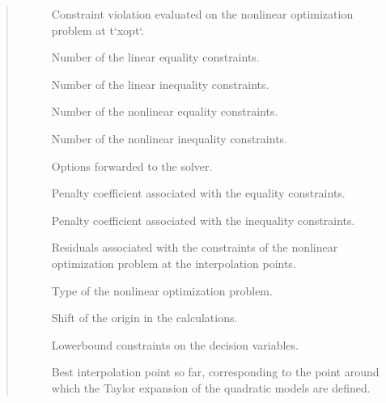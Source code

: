 \documentclass[letterpaper,10pt,english]{sphinxmanual}
\begin{document}
\begin{fulllineitems}
\begin{quote}
\begin{description}
\begin{description}
\item[{}] \leavevmode
\sphinxAtStartPar
Constraint violation evaluated on the nonlinear optimization problem at t`xopt`.

\item[{}] \leavevmode
\sphinxAtStartPar
Number of the linear equality constraints.

\item[{}] \leavevmode
\sphinxAtStartPar
Number of the linear inequality constraints.

\item[{}] \leavevmode
\sphinxAtStartPar
Number of the nonlinear equality constraints.

\item[{}] \leavevmode
\sphinxAtStartPar
Number of the nonlinear inequality constraints.

\item[{}] \leavevmode
\sphinxAtStartPar
Options forwarded to the solver.

\item[{}] \leavevmode
\sphinxAtStartPar
Penalty coefficient associated with the equality constraints.

\item[{}] \leavevmode
\sphinxAtStartPar
Penalty coefficient associated with the inequality constraints.

\item[{}] \leavevmode
\sphinxAtStartPar
Residuals associated with the constraints of the nonlinear optimization problem at the interpolation points.

\item[{}] \leavevmode
\sphinxAtStartPar
Type of the nonlinear optimization problem.

\item[{}] \leavevmode
\sphinxAtStartPar
Shift of the origin in the calculations.

\item[{}] \leavevmode
\sphinxAtStartPar
Lower\sphinxhyphen{}bound constraints on the decision variables.

\item[{}] \leavevmode
\sphinxAtStartPar
Best interpolation point so far, corresponding to the point around which the Taylor expansion of the quadratic models are defined.


\end{description}
\end{description}
\end{quote}
\end{fulllineitems}
\end{document}
